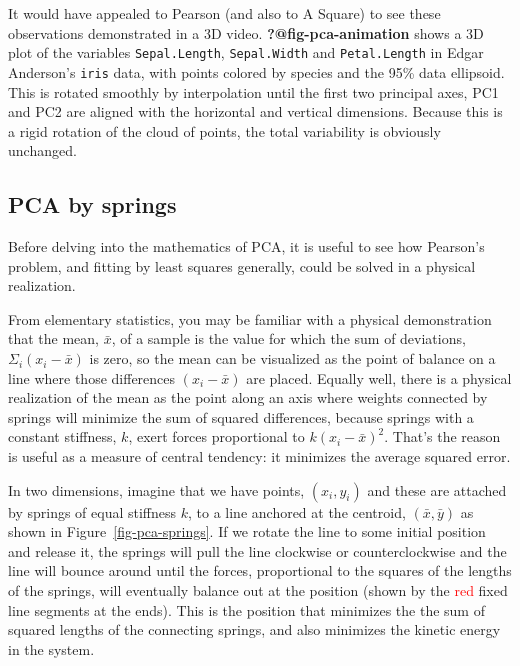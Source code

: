 \documentclass[
  letterpaper,
  10pt,
  krantz2]{krantz}
\begin{document}
It would have appealed to Pearson (and also to A Square) to see these
observations demonstrated in a 3D video. \textbf{?@fig-pca-animation}
shows a 3D plot of the variables \texttt{Sepal.Length},
\texttt{Sepal.Width} and \texttt{Petal.Length} in Edgar Anderson's
\texttt{iris} data, with points colored by species and the 95\% data
ellipsoid. This is rotated smoothly by interpolation until the first two
principal axes, PC1 and PC2 are aligned with the horizontal and vertical
dimensions. Because this is a rigid rotation of the cloud of points, the
total variability is obviously unchanged.

\hypertarget{pca-by-springs}{%
\subsection{PCA by springs}\label{pca-by-springs}}

Before delving into the mathematics of PCA, it is useful to see how
Pearson's problem, and fitting by least squares generally, could be
solved in a physical realization.

From elementary statistics, you may be familiar with a physical
demonstration that the mean, \(\bar{x}\), of a sample is the value for
which the sum of deviations, \(\Sigma_i (x_i - \bar{x})\) is zero, so
the mean can be visualized as the point of balance on a line where those
differences \((x_i - \bar{x})\) are placed. Equally well, there is a
physical realization of the mean as the point along an axis where
weights connected by springs will minimize the sum of squared
differences, because springs with a constant stiffness, \(k\), exert
forces proportional to \(k (x_i - \bar{x}) ^2\). That's the reason is
useful as a measure of central tendency: it minimizes the average
squared error.

In two dimensions, imagine that we have points, \((x_i, y_i)\) and these
are attached by springs of equal stiffness \(k\), to a line anchored at
the centroid, \((\bar{x}, \bar{y})\) as shown in
Figure~\ref{fig-pca-springs}. If we rotate the line to some initial
position and release it, the springs will pull the line clockwise or
counterclockwise and the line will bounce around until the forces,
proportional to the squares of the lengths of the springs, will
eventually balance out at the position (shown by the
\textcolor{red}{red} fixed line segments at the ends). This is the
position that minimizes the the sum of squared lengths of the connecting
springs, and also minimizes the kinetic energy in the system.
\end{document}
